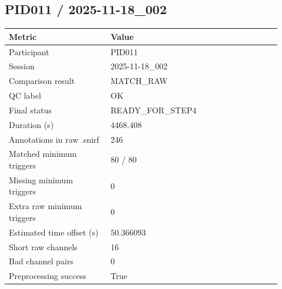 \subsection*{PID011 / 2025-11-18\_002}
\begin{tabular}{p{0.34\linewidth}p{0.58\linewidth}}
\toprule
Metric & Value\\
\midrule
Participant & PID011\\
Session & 2025-11-18\_002\\
Comparison result & MATCH\_RAW\\
QC label & OK\\
Final status & READY\_FOR\_STEP4\\
Duration (s) & 4468.408\\
Annotations in raw .snirf & 246\\
Matched minimum triggers & 80 / 80\\
Missing minimum triggers & 0\\
Extra raw minimum triggers & 0\\
Estimated time offset (s) & 50.366093\\
Short raw channels & 16\\
Bad channel pairs & 0\\
Preprocessing success & True\\
\bottomrule
\end{tabular}
